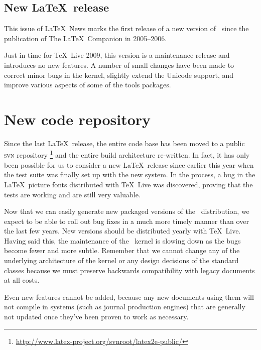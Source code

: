 \documentclass{ltnews}
\begin{document}
\maketitle

\subsection{New \LaTeX\ release}

This issue of \LaTeX~News marks the first release of a new version of
\LaTeXe\ since the publication of The \LaTeX\ Companion in 2005--2006.

Just in time for \TeX\ Live 2009, this version is a maintenance
release and introduces no new features. A number of small changes have
been made to correct minor bugs in the kernel, slightly extend the Unicode
support, and improve various
aspects of some of the \textsf{tools} packages.

\section{New code repository}

Since the last \LaTeX\ release, the entire code base has been moved
to a public \textsc{svn} repository%
\footnote{\url{http://www.latex-project.org/svnroot/latex2e-public/}}
and the entire build architecture re-written. In fact, it has only
been possible for us to consider a new \LaTeX\ release since earlier
this year when the test suite was finally set up with the new system.
In the process, a bug in the \LaTeX\ picture fonts distributed with
\TeX\ Live was discovered, proving that the
tests are working and are still very valuable.

Now that we can easily generate new packaged versions of the \LaTeXe\
distribution, we expect to be able to roll out bug fixes in a much
more timely manner than over the last few years. New versions should
be distributed yearly with \TeX\ Live. Having said this, the
maintenance of the \LaTeXe\ kernel is slowing down as the bugs become
fewer and more subtle. Remember that we cannot change any of the
underlying architecture of the kernel or any design decisions of the
standard classes because we must preserve backwards compatibility with
legacy documents at all costs.

Even new features cannot be added, because any new documents using
them will not compile in systems (such as journal production engines)
that are generally not updated once they've been proven to work as
necessary.
\end{document}
